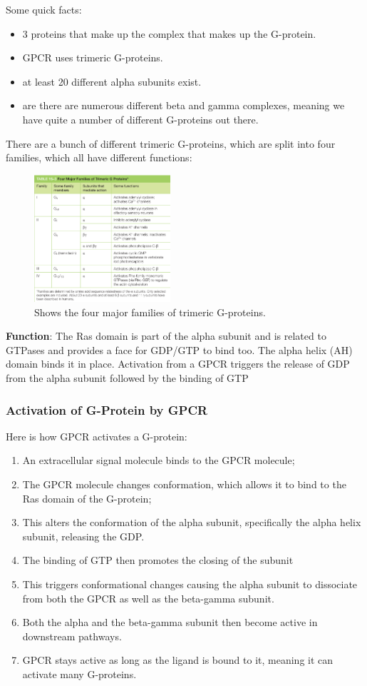 \documentclass[../main.tex]{subfiles}
\begin{document}
Some quick facts:
\begin{itemize}
	\item 3 proteins that make up the complex that makes up the G-protein.
	\item GPCR uses trimeric G-proteins.
	\item at least 20 different alpha subunits exist.
	\item are there are numerous different beta and gamma complexes, meaning we have quite a number of different G-proteins out there.
\end{itemize}

There are a bunch of different trimeric G-proteins, which are split into four families, which all have different functions:
\begin{figure}[H]
	\centering
	\includegraphics[width=0.45\textwidth]{G_families}
	\caption{Shows the four major families of trimeric G-proteins.}
\end{figure}

\textbf{Function}: The Ras domain is part of the alpha subunit and is related to GTPases and provides a face for GDP/GTP to bind too. The alpha helix (AH) domain binds it in place. Activation from a GPCR triggers the release of GDP from the alpha subunit followed by the binding of GTP
 
\subsubsection{Activation of G-Protein by GPCR}

Here is how GPCR activates a G-protein:
\begin{enumerate}
	\item An extracellular signal molecule binds to the GPCR molecule;
	\item The GPCR molecule changes conformation, which allows it to bind to the Ras domain of the G-protein;
	\item This alters the conformation of the alpha subunit, specifically the alpha helix subunit, releasing the GDP.
	\item The binding of GTP then promotes the closing of the subunit
	\item This triggers conformational changes causing the alpha subunit to dissociate from both the GPCR as well as the beta-gamma subunit.
	\item Both the alpha and the beta-gamma subunit then become active in downstream pathways.
	\item GPCR stays active as long as the ligand is bound to it, meaning it can activate many G-proteins.
\end{enumerate}
\end{document}
